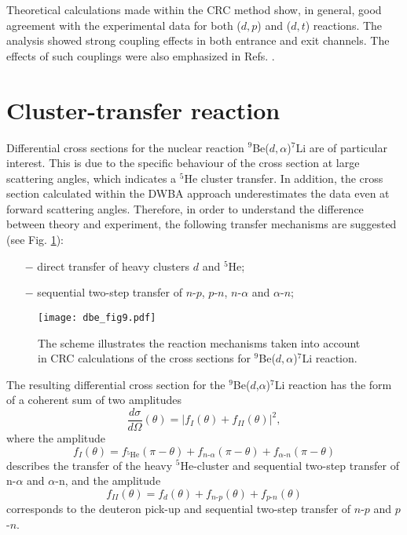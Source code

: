 \documentclass[
12pt, %
oneside, %
english, %
onehalfspacing, %
onehalfspacing, %
headsepline, %
]{MastersDoctoralThesis} %
\begin{document}
Theoretical calculations made within the CRC method show, in general, good agreement with the experimental data for both ($d,p$)  and ($d,t$) reactions.
The analysis showed strong coupling effects in both entrance and exit channels. The effects of such couplings were also emphasized in Refs. \cite{harakeh1980strong, rudchik2016}.

\section{Cluster-transfer reaction}
Differential cross sections for the nuclear reaction ${^9}$Be($d,\alpha$)${}^7$Li are of particular interest. This is due to the specific behaviour of the cross section at large scattering angles, which indicates a ${}^5$He cluster transfer. In addition, the cross section calculated within the DWBA approach underestimates the data even at forward scattering angles. Therefore, in order to understand the difference between theory and experiment, the following transfer mechanisms are suggested (see Fig. \ref{dbe_fig9}):
\begin{itemize}
\item[$-$] direct transfer of heavy clusters $d$ and ${}^5$He;
\item[$-$] sequential two-step transfer of $n$-$p$, $p$-$n$, $n$-$\alpha$ and $\alpha$-$n$;
\end{itemize}


\begin{figure}[tp]
\centering
\texttt{[image: dbe\_fig9.pdf]}
\decoRule
\caption{\label{dbe_fig9} \footnotesize The scheme illustrates the reaction mechanisms taken into account in CRC calculations of the cross sections for ${}^9$Be($d,\alpha$)${}^7$Li reaction.}
\end{figure}


The resulting differential cross section for the ${^9}$Be($d$,$\alpha$)${}^7$Li reaction has the form of a coherent sum of two amplitudes
\begin{equation}
\frac{d\sigma}{d\Omega}(\theta) =\vert f_{I}(\theta) + f_{II}(\theta) \vert ^2,
\end{equation}
where the amplitude
\begin{equation} \label{eq:ampl1}
f_{I}(\theta)=f_{{}^5\textrm{He}}(\pi - \theta) + f_{n\textrm{-}\alpha}(\pi - \theta) + f_{\alpha\textrm{-}n}(\pi - \theta)
\end{equation}
describes the transfer of the heavy ${}^5$He-cluster and sequential two-step transfer of n-$\alpha$ and $\alpha$-n, and the amplitude
\begin{equation} \label{eq:ampl2}
f_{II}(\theta)=f_{d}(\theta) + f_{n\textrm{-}p}( \theta) + f_{p\textrm{-}n}(\theta)
\end{equation}
corresponds to the deuteron pick-up and sequential two-step transfer of $n$-$p$ and $p$-$n$.
\end{document}
